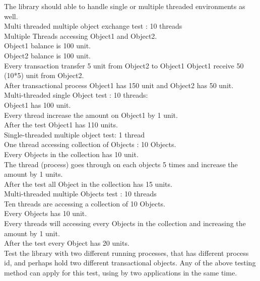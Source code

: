 \documentclass[12pt]{article}
\begin{document}
{\setlength{\parindent}{0cm}
The library should able to handle single or multiple threaded environments as well.\\

Multi threaded multiple object exchange test : 10 threads\\
Multiple Threads accessing Object1 and Object2.\\
Object1 balance is 100 unit.\\
Object2 balance is 100 unit.\\
Every transaction transfer 5 unit from Object2 to Object1
Object1 receive 50 (10*5) unit from Object2.\\
After transactional process Object1 has 150 unit and Object2 has 50 unit.\\

Multi-threaded single Object test : 10 threads:\\
Object1 has 100 unit.\\
Every thread increase the amount on Object1 by 1 unit.\\
After the test Object1 has 110 units.\\

Single-threaded multiple object test: 1 thread\\
One thread accessing collection of Objects : 10 Objects.\\
Every Objects in the collection has 10 unit.\\
The thread (process) goes through on each objects 5 times and increase the amount by 1 units.\\
After the test all Object in the collection has 15 units.  \\

Multi-threaded multiple Objects test : 10 threads\\
Ten threads are  accessing a collection of 10 Objects.\\
Every Objects has 10 unit.\\
Every threads will accessing every Objects in the collection and increasing the amount by 1 unit.\\
After the test every Object has 20 units.\\

Test the library with two different running processes, that has different process id, and perhaps hold two different transactional objects. Any of the above testing method can apply for this test, using by two applications in the same time.  


}
\end{document}
